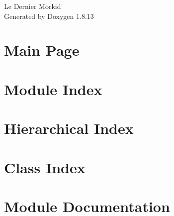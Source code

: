 \documentclass[twoside]{book}
\newcommand{\+}{\discretionary{\mbox{\scriptsize$\hookleftarrow$}}{}{}}
\newcommand{\clearemptydoublepage}{%
  \newpage{\pagestyle{empty}\cleardoublepage}%
}
\begin{document}
\hypersetup{pageanchor=false,
             bookmarksnumbered=true,
             pdfencoding=unicode
            }
\begin{titlepage}
\vspace*{7cm}
\begin{center}%
{\Large Le Dernier Morkid }\\
\vspace*{1cm}
{\large Generated by Doxygen 1.8.13}\\
\end{center}
\end{titlepage}
\clearemptydoublepage
{}
\tableofcontents
\clearemptydoublepage
{}
\hypersetup{pageanchor=true}

\chapter{Main Page}
\label{index}\hypertarget{index}{}
\chapter{Module Index}

\chapter{Hierarchical Index}

\chapter{Class Index}

\chapter{Module Documentation}





\end{document}
